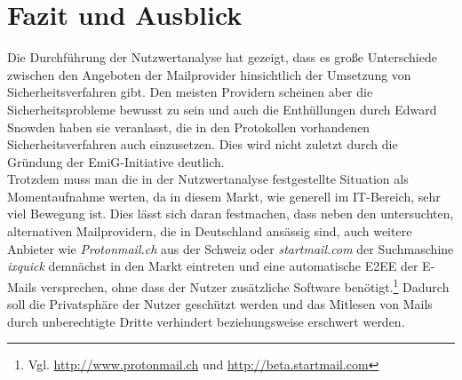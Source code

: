 \documentclass  [paper=a4,
				fontsize=12pt,
				listof=totoc,
				bibliography=totoc
				]{scrreprt}
\begin{document}
%			
%			
%			
				
			
	\chapter{Fazit und Ausblick}
		\color{black}
		Die Durchführung der Nutzwertanalyse hat gezeigt, dass es große Unterschiede zwischen den Angeboten der Mailprovider hinsichtlich der Umsetzung von Sicherheitsverfahren gibt.
		Den meisten Providern scheinen aber die Sicherheitsprobleme bewusst zu sein und auch die Enthüllungen durch Edward Snowden haben sie veranlasst, die in den Protokollen vorhandenen Sicherheitsverfahren auch einzusetzen.
		Dies wird nicht zuletzt durch die Gründung der \ac{EmiG}-Initiative deutlich.\medskip\\
		
		Trotzdem muss man die in der Nutzwertanalyse festgestellte Situation als Momentaufnahme werten, da in diesem Markt, wie generell im IT-Bereich, sehr viel Bewegung ist.
		Dies lässt sich daran festmachen, dass neben den untersuchten, alternativen Mailprovidern, die in Deutschland ansässig sind, auch weitere Anbieter wie \textit{Protonmail.ch} aus der Schweiz oder \textit{startmail.com} der Suchmaschine \textit{ixquick} demnächst in den Markt eintreten und eine automatische \ac{E2EE} der E-Mails versprechen, ohne dass der Nutzer zusätzliche Software benötigt.\footnote{Vgl. \url{http://www.protonmail.ch} und \url{http://beta.startmail.com}}
		Dadurch soll die Privatsphäre der Nutzer geschützt werden und das Mitlesen von Mails durch unberechtigte Dritte verhindert beziehungsweise erschwert werden.\medskip\\
		
\end{document}
